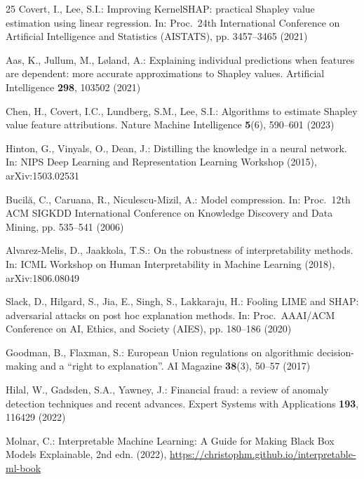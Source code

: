 \documentclass[runningheads]{llncs}
\begin{document}
\begin{thebibliography}{25}
Covert, I., Lee, S.I.: Improving KernelSHAP: practical Shapley value
estimation using linear regression. In: Proc.\ 24th International
Conference on Artificial Intelligence and Statistics (AISTATS),
pp. 3457--3465 (2021)

Aas, K., Jullum, M., L{\o}land, A.: Explaining individual predictions when
features are dependent: more accurate approximations to Shapley values.
Artificial Intelligence \textbf{298}, 103502 (2021)

Chen, H., Covert, I.C., Lundberg, S.M., Lee, S.I.: Algorithms to estimate
Shapley value feature attributions. Nature Machine Intelligence
\textbf{5}(6), 590--601 (2023)

Hinton, G., Vinyals, O., Dean, J.: Distilling the knowledge in a neural
network. In: NIPS Deep Learning and Representation Learning Workshop
(2015), arXiv:1503.02531

Bucil\u{a}, C., Caruana, R., Niculescu-Mizil, A.: Model compression. In:
Proc.\ 12th ACM SIGKDD International Conference on Knowledge Discovery and
Data Mining, pp. 535--541 (2006)

Alvarez-Melis, D., Jaakkola, T.S.: On the robustness of interpretability
methods. In: ICML Workshop on Human Interpretability in Machine Learning
(2018), arXiv:1806.08049

Slack, D., Hilgard, S., Jia, E., Singh, S., Lakkaraju, H.: Fooling LIME and
SHAP: adversarial attacks on post hoc explanation methods. In: Proc.\
AAAI/ACM Conference on AI, Ethics, and Society (AIES), pp. 180--186 (2020)

Goodman, B., Flaxman, S.: European Union regulations on algorithmic
decision-making and a ``right to explanation''. AI Magazine
\textbf{38}(3), 50--57 (2017)

Hilal, W., Gadsden, S.A., Yawney, J.: Financial fraud: a review of anomaly
detection techniques and recent advances. Expert Systems with Applications
\textbf{193}, 116429 (2022)

Molnar, C.: Interpretable Machine Learning: A Guide for Making Black Box
Models Explainable, 2nd edn. (2022), \url{https://christophm.github.io/interpretable-ml-book}

\end{thebibliography}
\end{document}
